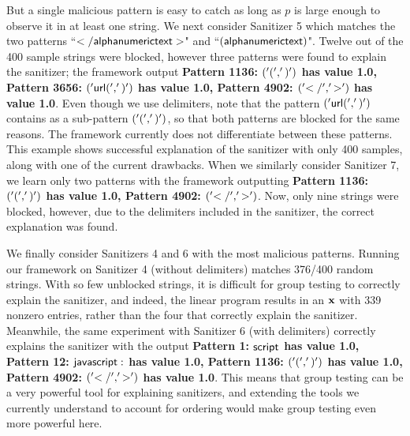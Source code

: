 But a single malicious pattern is easy to catch as long as $p$ is large enough to observe it in at least one string. We next consider Sanitizer 5 which matches the two patterns ``$\sf{</alphanumerictext>}$" and ``$\sf{(alphanumerictext)}$". Twelve out of the 400 sample strings were blocked, however three patterns were found to explain the sanitizer; the framework output \textbf{Pattern 1136: $\sf{('(', ')')}$ has value 1.0, Pattern 3656: $\sf{('url(', ')')}$ has value 1.0, Pattern 4902: $\sf{('</', '>')}$ has value 1.0}. Even though we use delimiters, note that the pattern $\sf{('url(', ')')}$ contains as a sub-pattern $\sf{('(', ')')}$, so that both patterns are blocked for the same reasons. The framework currently does not differentiate between these patterns. This example shows successful explanation of the sanitizer with only 400 samples, along with one of the current drawbacks. When we similarly consider Sanitizer 7, we learn only two patterns with the framework outputting \textbf{Pattern 1136: $\sf{('(', ')')}$ has value 1.0, Pattern 4902: $\sf{('</', '>')}$}. Now, only nine strings were blocked, however, due to the delimiters included in the sanitizer, the correct explanation was found.
	
We finally consider Sanitizers 4 and 6 with the most malicious patterns. Running our framework on Sanitizer 4 (without delimiters) matches 376/400 random strings.  With so few unblocked strings, it is difficult for group testing to correctly explain the sanitizer, and indeed, the linear program results in an $\mathbf{x}$ with 339 nonzero entries, rather than the four that correctly explain the sanitizer. Meanwhile, the same experiment with Sanitizer 6 (with delimiters) correctly explains the sanitizer with the output \textbf{Pattern 1: $\sf{script}$ has value 1.0, Pattern 12: $\sf{javascript:}$ has value 1.0, Pattern 1136: $\sf{('(', ')')}$ has value 1.0, Pattern 4902: $\sf{('</', '>')}$ has value 1.0}. This means that group testing can be a very powerful tool for explaining sanitizers, and extending the tools we currently understand to account for ordering would make group testing even more powerful here.
